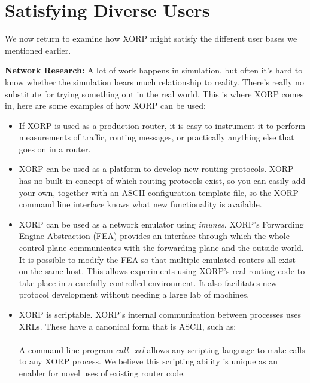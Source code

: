 \section{Satisfying Diverse Users}

\noindent We now return to examine how XORP might satisfy the different user
bases we mentioned earlier.

\vspace{0.1in}\noindent\textbf{Network Research:}
A lot of work happens in simulation,
but often it's hard to know whether the simulation bears much
relationship to reality.  There's really no substitute for trying
something out in the real world.  This is where XORP comes in, here are some examples of how XORP can be used:
\vspace{-0.07in}
\begin{itemize}
\item If XORP is used as a production router, it is easy to instrument
it to perform measurements of traffic, routing messages, or
practically anything else that goes on in a router.  
\vspace{-0.07in}
\item XORP can be used as a platform to develop new routing protocols.
XORP has no built-in concept of which routing protocols exist, so you
can easily add your own, together with an ASCII configuration template
file, so the XORP command line interface knows what new
functionality is available.
\vspace{-0.07in}
\item XORP can be used as a network emulator using {\it imunes}\cite{imunes}.
XORP's Forwarding Engine Abstraction (FEA) provides an
interface through which the whole control plane communicates
with the forwarding plane and the outside world.  It is possible to
modify the FEA so that multiple emulated routers all exist on the same
host.  This allows experiments using XORP's real routing code to take
place in a carefully controlled environment.  It also facilitates new
protocol development without needing a large lab of machines.
\vspace{-0.07in}
\item XORP is scriptable.  XORP's internal communication between
processes uses XRLs.
These have a canonical form that is ASCII, such as:\\
\parindent 20pt
\\
A command line program \textit{call\_xrl} 
allows any scripting language to make calls to any XORP process.  We
believe this scripting ability is unique as an enabler for novel uses of
existing router code.
\end{itemize}

